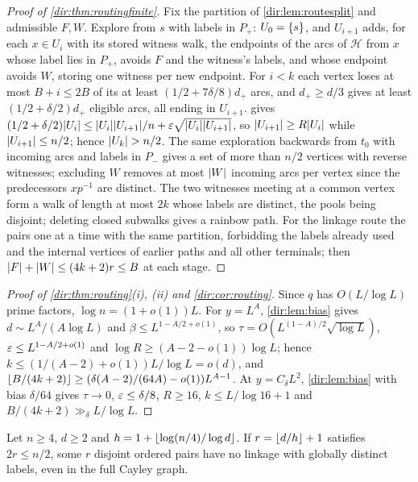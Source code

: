 \begin{proof}[Proof of \cref{dir:thm:routingfinite}]
Fix the partition of \cref{dir:lem:routesplit} and admissible $F,W$. Explore from $s$ with labels in $P_+$:
$U_0=\{s\}$, and $U_{i+1}$ adds, for each $x\in U_i$ with its stored witness walk, the endpoints of the
arcs of $\mathcal H$ from $x$ whose label lies in $P_+$, avoids $F$ and the witness's labels, and whose
endpoint avoids $W$, storing one witness per new endpoint. For $i<k$ each vertex loses at most $B+i\le2B$
of its at least $(1/2+7\delta/8)d_+$ arcs, and $d_+\ge d/3$ gives at least $(1/2+\delta/2)d_+$ eligible arcs,
all ending in $U_{i+1}$.  gives
$(1/2+\delta/2)\lvert U_i\rvert\le\lvert U_i\rvert\lvert U_{i+1}\rvert/n+\varepsilon\sqrt{\lvert U_i\rvert\lvert U_{i+1}\rvert}$, so
$\lvert U_{i+1}\rvert\ge R\lvert U_i\rvert$ while $\lvert U_{i+1}\rvert\le n/2$; hence $\lvert U_k\rvert>n/2$. The same exploration
backwards from $t_0$ with incoming arcs and labels in $P_-$ gives a set of more than $n/2$ vertices
with reverse witnesses; excluding $W$ removes at most $\lvert W\rvert$ incoming arcs per vertex since the
predecessors $xp^{-1}$ are distinct. The two witnesses meeting at a common vertex form a walk of length
at most $2k$ whose labels are distinct, the pools being disjoint; deleting closed subwalks gives a
rainbow path. For the linkage route the pairs one at a time with the same partition, forbidding the
labels already used and the internal vertices of earlier paths and all other terminals; then
$\lvert F\rvert+\lvert W\rvert\le(4k+2)r\le B$ at each stage.
\end{proof}

\begin{proof}[Proof of \cref{dir:thm:routing}\textup{(i)}, \textup{(ii)} and \cref{dir:cor:routing}]
Since $q$ has $O(L/\log L)$ prime factors, $\log n=(1+o(1))L$. For $y=L^A$, \cref{dir:lem:bias} gives
$d\sim L^A/(A\log L)$ and $\beta\le L^{1-A/2+o(1)}$, so $\tau=O(L^{(1-A)/2}\sqrt{\log L})$,
$\varepsilon\le L^{1-A/2+o(1)}$ and $\log R\ge(A-2-o(1))\log L$; hence
$k\le(1/(A-2)+o(1))L/\log L=o(d)$, and
$\lfloor B/(4k+2)\rfloor\ge(\delta(A-2)/(64A)-o(1))L^{A-1}$. At $y=C_\delta L^2$,
\cref{dir:lem:bias} with bias $\delta/64$ gives $\tau\to0$, $\varepsilon\le\delta/8$, $R\ge16$, $k\le L/\log16+1$ and $B/(4k+2)\gg_\delta L/\log L$.
\end{proof}

\begin{proposition}\label{dir:prop:routingupper}
Let $n\ge4$, $d\ge2$ and $h=1+\lfloor\log(n/4)/\log d\rfloor$. If $r=\lfloor d/h\rfloor+1$ satisfies $2r\le n/2$, some $r$
disjoint ordered pairs have no linkage with globally distinct labels, even in the full Cayley graph.
\end{proposition}

